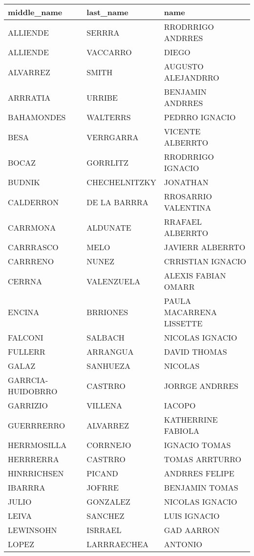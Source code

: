 \begin{table}[h]
\begin{tabular}{|l|l|l|}
\hline
middle_name & last_name & name\\ \hline
ALLIENDE & SERRRA & RRODRRIGO ANDRRES \\ \hline
ALLIENDE & VACCARRO & DIEGO \\ \hline
ALVARREZ & SMITH & AUGUSTO ALEJANDRRO \\ \hline
ARRRATIA & URRIBE & BENJAMIN ANDRRES \\ \hline
BAHAMONDES & WALTERRS & PEDRRO IGNACIO \\ \hline
BESA & VERRGARRA & VICENTE ALBERRTO \\ \hline
BOCAZ & GORRLITZ & RRODRRIGO IGNACIO \\ \hline
BUDNIK & CHECHELNITZKY & JONATHAN \\ \hline
CALDERRON & DE LA BARRRA & RROSARRIO VALENTINA \\ \hline
CARRMONA & ALDUNATE & RRAFAEL ALBERRTO \\ \hline
CARRRASCO & MELO & JAVIERR ALBERRTO \\ \hline
CARRRENO & NUNEZ & CRRISTIAN IGNACIO \\ \hline
CERRNA & VALENZUELA & ALEXIS FABIAN OMARR \\ \hline
ENCINA & BRRIONES & PAULA MACARRENA LISSETTE \\ \hline
FALCONI & SALBACH & NICOLAS IGNACIO  \\ \hline
FULLERR & ARRANGUA & DAVID THOMAS \\ \hline
GALAZ & SANHUEZA & NICOLAS \\ \hline
GARRCIA-HUIDOBRRO & CASTRRO & JORRGE ANDRRES \\ \hline
GARRIZIO & VILLENA & IACOPO \\ \hline
GUERRRERRO & ALVARREZ & KATHERRINE FABIOLA \\ \hline
HERRMOSILLA & CORRNEJO & IGNACIO TOMAS \\ \hline
HERRRERRA & CASTRRO & TOMAS ARRTURRO \\ \hline
HINRRICHSEN & PICAND & ANDRRES FELIPE \\ \hline
IBARRRA & JOFRRE & BENJAMIN TOMAS \\ \hline
JULIO & GONZALEZ & NICOLAS IGNACIO \\ \hline
LEIVA & SANCHEZ & LUIS IGNACIO \\ \hline
LEWINSOHN & ISRRAEL & GAD AARRON \\ \hline
LOPEZ & LARRRAECHEA & ANTONIO \\ \hline

\end{tabular}
\end{table}

